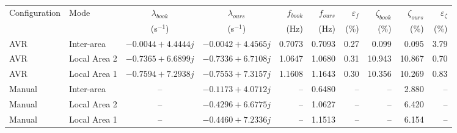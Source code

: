 \begin{tabular}{llccrrrrrr}\toprule
{Configuration} & {Mode} & {$\lambda_{book}$} & {$\lambda_{ours}$} & {$f_{book}$} & {$f_{ours}$} & {$\varepsilon_f$} & {$\zeta_{book}$} & {$\zeta_{ours}$} & {$\varepsilon_{\zeta}$}\\
{} & {} & {(s$^{-1}$)} & {(s$^{-1}$)} & {(Hz)} & {(Hz)} & {(\%)} & {(\%)} & {(\%)} & {(\%)}\\ \midrule
AVR & Inter-area & $-0.0044+4.4444j$ & $-0.0042+4.4565j$ & 0.7073 & 0.7093 & 0.27 & 0.099 & 0.095 & 3.79\\
AVR & Local Area 2 & $-0.7365+6.6899j$ & $-0.7336+6.7108j$ & 1.0647 & 1.0680 & 0.31 & 10.943 & 10.867 & 0.70\\
AVR & Local Area 1 & $-0.7594+7.2938j$ & $-0.7553+7.3157j$ & 1.1608 & 1.1643 & 0.30 & 10.356 & 10.269 & 0.83\\
Manual & Inter-area & {--} & $-0.1173+4.0712j$ & {--} & 0.6480 & {--} & {--} & 2.880 & {--}\\
Manual & Local Area 2 & {--} & $-0.4296+6.6775j$ & {--} & 1.0627 & {--} & {--} & 6.420 & {--}\\
Manual & Local Area 1 & {--} & $-0.4460+7.2336j$ & {--} & 1.1513 & {--} & {--} & 6.154 & {--}\\
\bottomrule\end{tabular}
